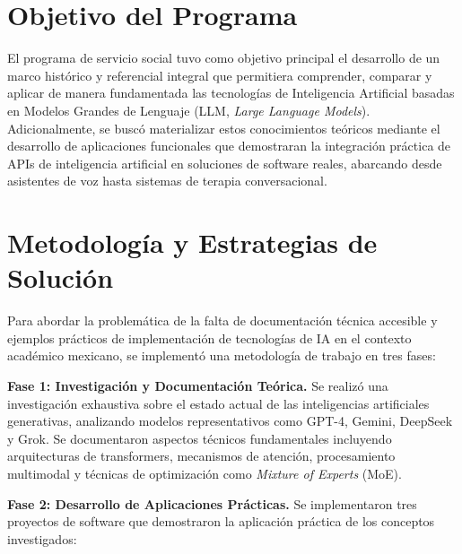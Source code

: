 \documentclass[12pt,letterpaper]{article}
\begin{document}

\section{Objetivo del Programa}

El programa de servicio social tuvo como objetivo principal el desarrollo de un marco histórico y referencial integral que permitiera comprender, comparar y aplicar de manera fundamentada las tecnologías de Inteligencia Artificial basadas en Modelos Grandes de Lenguaje (LLM, \textit{Large Language Models}). Adicionalmente, se buscó materializar estos conocimientos teóricos mediante el desarrollo de aplicaciones funcionales que demostraran la integración práctica de APIs de inteligencia artificial en soluciones de software reales, abarcando desde asistentes de voz hasta sistemas de terapia conversacional.

\section{Metodología y Estrategias de Solución}

Para abordar la problemática de la falta de documentación técnica accesible y ejemplos prácticos de implementación de tecnologías de IA en el contexto académico mexicano, se implementó una metodología de trabajo en tres fases:

\textbf{Fase 1: Investigación y Documentación Teórica.} Se realizó una investigación exhaustiva sobre el estado actual de las inteligencias artificiales generativas, analizando modelos representativos como GPT-4, Gemini, DeepSeek y Grok. Se documentaron aspectos técnicos fundamentales incluyendo arquitecturas de transformers, mecanismos de atención, procesamiento multimodal y técnicas de optimización como \textit{Mixture of Experts} (MoE).

\textbf{Fase 2: Desarrollo de Aplicaciones Prácticas.} Se implementaron tres proyectos de software que demostraron la aplicación práctica de los conceptos investigados:
\end{document}
